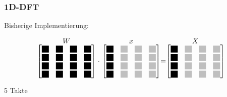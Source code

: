 \begin{frame}[t]\frametitle{1D-DFT}

Bisherige Implementierung:

\hspace{2cm}
\begin{minipage}{0.6\textwidth}
\begingroup
\renewcommand*{\arraystretch}{0.8}
 \[
  \stackrel{\mbox{$W$}}{
   \begin{bmatrix}
    \myBlackBox & \myBlackBox & \myBlackBox & \myBlackBox \\
    \myBlackBox & \myBlackBox & \myBlackBox & \myBlackBox \\
    \myBlackBox & \myBlackBox & \myBlackBox & \myBlackBox \\
    \myBlackBox & \myBlackBox & \myBlackBox & \myBlackBox 
   \end{bmatrix}
  }
  \cdot
  \stackrel{\mbox{$x$}}{
   \begin{bmatrix}
    \myBlackBox & \myLightgrayBox & \myLightgrayBox & \myLightgrayBox \\
    \myBlackBox & \myLightgrayBox & \myLightgrayBox & \myLightgrayBox \\
    \myBlackBox & \myLightgrayBox & \myLightgrayBox & \myLightgrayBox \\
    \myBlackBox & \myLightgrayBox & \myLightgrayBox & \myLightgrayBox 
   \end{bmatrix}
  }
  =
  \stackrel{\mbox{$X$}}{
   \begin{bmatrix}
    \myBlackBox & \myLightgrayBox & \myLightgrayBox & \myLightgrayBox \\
    \myBlackBox & \myLightgrayBox & \myLightgrayBox & \myLightgrayBox \\
    \myBlackBox & \myLightgrayBox & \myLightgrayBox & \myLightgrayBox \\
    \myBlackBox & \myLightgrayBox & \myLightgrayBox & \myLightgrayBox 
   \end{bmatrix}
  }
 \]
\endgroup

 
 \end{minipage}
 \hfill
 \begin{minipage}[t][][c]{0.2\textwidth}
 \vspace{0pt}
  5 Takte
 \end{minipage}

\end{frame}




